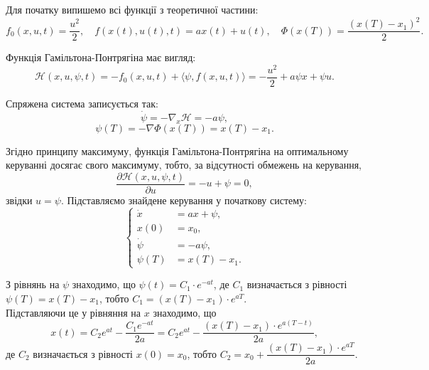 \begin{solution}
	Для початку випишемо всі функції з теоретичної частини:
	\begin{equation}
		f_0(x, u, t) = \dfrac{u^2}{2}, \quad f(x(t), u(t), t) = a x(t) + u(t), \quad \Phi(x(T)) = \dfrac{(x(T) - x_1)^2}{2}.
	\end{equation}

	Функція Гамільтона-Понтрягіна має вигляд:
	\begin{equation}
		\mathcal{H}(x, u, \psi, t) = - f_0(x, u, t) + \langle \psi, f(x, u, t) \rangle = - \dfrac{u^2}{2} + a \psi x + \psi u.
	\end{equation}

	Спряжена система записується так:
	\begin{equation}
		\dot \psi = - \nabla_x \mathcal{H} = - a \psi,
	\end{equation}
	\begin{equation}
		\psi(T) = - \nabla \Phi(x(T)) = x(T) - x_1.
	\end{equation}

	Згідно принципу максимуму, функція Гамільтона-Понтрягіна на оптимальному керуванні досягає свого максимуму, тобто, за відсутності обмежень на керування,
	\begin{equation}
		\dfrac{\partial \mathcal{H}(x, u, \psi, t)}{\partial u} = - u + \psi = 0,
	\end{equation}
	звідки $u = \psi$. Підставляємо знайдене керування у початкову систему:
	\[ \left\{ \begin{aligned}
		\dot x &= a x + \psi, \\
		x(0) &= x_0, \\
		\dot \psi &= - a \psi, \\
		\psi(T) &= x(T) - x_1.
	\end{aligned} \right. \]

	З рівнянь на $\psi$ знаходимо, що $\psi(t) = C_1 \cdot e^{-a t}$, де $C_1$ визначається з рівності $\psi(T) = x(T) - x_1$, тобто $C_1 = (x(T) - x_1) \cdot e^{a T}$. \\

	Підставляючи це у рівняння на $x$ знаходимо, що 
	\begin{equation}
		x(t) = C_2 e^{a t} - \dfrac{C_1 e^{-a t}}{2 a} = C_2 e^{a t} - \dfrac{(x(T) - x_1) \cdot e^{a (T - t)}}{2 a},
	\end{equation}
	де $C_2$ визначається з рівності $x(0) = x_0$, тобто $C_2 = x_0 + \dfrac{(x(T) - x_1) \cdot e^{a T}}{2 a}$. \\


\end{solution}
